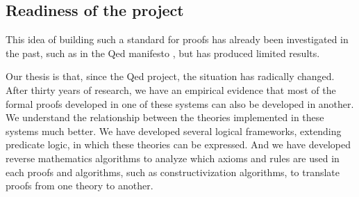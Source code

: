 

\subsection{Readiness of the project}

This idea of building such a standard for proofs has already been
investigated in the past, such as in the Qed manifesto \cite{Qed94}, but
has produced limited results.

Our thesis is that, since the
Qed project, the situation has radically changed. After
thirty years of research, we have an empirical evidence that most of
the formal proofs developed in one of these systems can also be
developed in another. We understand the relationship between the
theories implemented in these systems much better. We have developed
several logical frameworks, extending predicate logic, in which these
theories can be expressed. And we have developed reverse mathematics
algorithms to analyze which axioms and rules are used in each proofs
and algorithms, such as constructivization algorithms, to translate
proofs from one theory to another.


